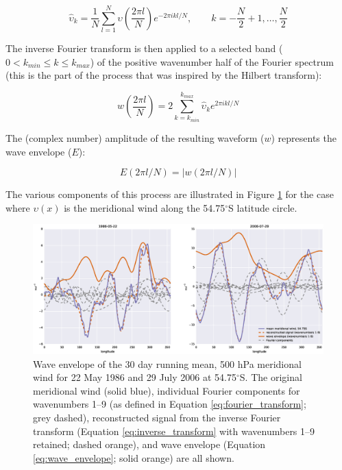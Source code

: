 \begin{equation}\label{eq:fourier_transform}
\hat{\upsilon}_k = \frac{1}{N}\sum_{l=1}^N \upsilon \left( \frac{2 \pi l}{N} \right) e^{-2 \pi ikl/N},\qquad k = -\frac{N}{2} + 1, \dotsc, \frac{N}{2}
\end{equation}

\noindent The inverse Fourier transform is then applied to a selected band ($0 < k_{min} \leq k \leq k_{max}$) of the positive wavenumber half of the Fourier spectrum (this is the part of the process that was inspired by the Hilbert transform):

\begin{equation}\label{eq:inverse_transform}
w \left( \frac{2 \pi l}{N} \right) = 2 \sum_{k=k_{min}}^{k_{max}} \hat{\upsilon}_k e^{2\pi ikl/N}
\end{equation}

\noindent The (complex number) amplitude of the resulting waveform ($w$) represents the wave envelope ($E$):

\begin{equation}\label{eq:wave_envelope}
E(2 \pi l / N) = | w(2 \pi l / N) |
\end{equation}

\noindent The various components of this process are illustrated in Figure \ref{fig:example_hilbert} for the case where $\upsilon(x)$ is the meridional wind along the 54.75$^{\circ}$S latitude circle. 

\begin{figure}
\begin{center}
\includegraphics[width=1\columnwidth]{figures/zonalwaves/hilbert_zw_w19_va_ERAInterim_500hPa_030day-runmean_native-55S_1986-05-22_2006-07-29.eps}
\caption[Wave envelope of the 30 day running mean, 500 hPa meridional wind for 22 May 1986 and 29 July 2006 at 54.75$^{\circ}$S]{\label{fig:example_hilbert}
Wave envelope of the 30 day running mean, 500 hPa meridional wind for 22 May 1986 and 29 July 2006 at 54.75$^{\circ}$S. The original meridional wind (solid blue), individual Fourier components for wavenumbers 1--9 (as defined in Equation \ref{eq:fourier_transform}; grey dashed), reconstructed signal from the inverse Fourier transform (Equation \ref{eq:inverse_transform} with wavenumbers 1--9 retained; dashed orange), and wave envelope (Equation \ref{eq:wave_envelope}; solid orange) are all shown. %
}
\end{center}
\end{figure}

